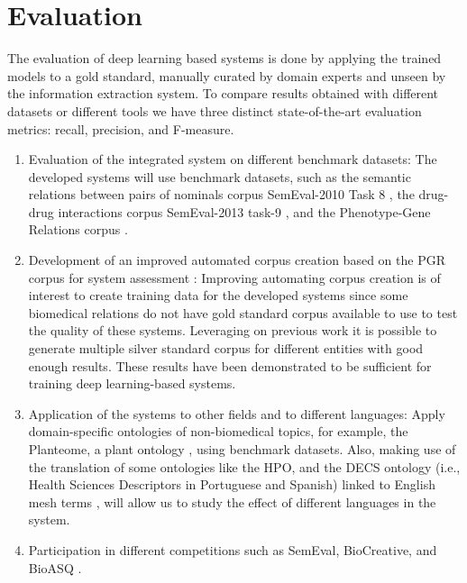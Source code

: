 \section{Evaluation}

The evaluation of deep learning based systems is done by applying the trained models to a gold standard, manually curated by domain experts and unseen by the information extraction system. To compare results obtained with different datasets or different tools we have three distinct state-of-the-art evaluation metrics: recall, precision, and F-measure.

\begin{enumerate}
    \item Evaluation of the integrated system on different benchmark datasets: The developed systems will use benchmark datasets, such as the semantic relations between pairs of nominals corpus SemEval-2010 Task 8 \citep{hendrickx2010semeval}, the drug-drug interactions corpus SemEval-2013 task-9 \citep{segura2013semeval}, and the Phenotype-Gene Relations corpus \citep{sousa2019silver}.
    \item Development of an improved automated corpus creation based on the PGR corpus for system assessment \citep{sousa2019silver}: Improving automating corpus creation is of interest to create training data for the developed systems since some biomedical relations do not have gold standard corpus available to use to test the quality of these systems. Leveraging on previous work \citep{sousa2019silver} it is possible to generate multiple silver standard corpus for different entities with good enough results. These results have been demonstrated to be sufficient for training deep learning-based systems.
    \item  Application of the systems to other fields and to different languages: Apply domain-specific ontologies of non-biomedical topics, for example, the Planteome, a plant ontology \citep{cooper2018planteome}, using benchmark datasets. Also, making use of the translation of some ontologies like the HPO, and the DECS ontology \citep{campanatti2010health} (i.e., Health Sciences Descriptors in Portuguese and Spanish) linked to English mesh terms \citep{papagiannopoulou2016large}, will allow us to study the effect of different languages in the system.
    \item Participation in different competitions such as SemEval, BioCreative, and BioASQ \citep{huang2016community}.
\end{enumerate}

